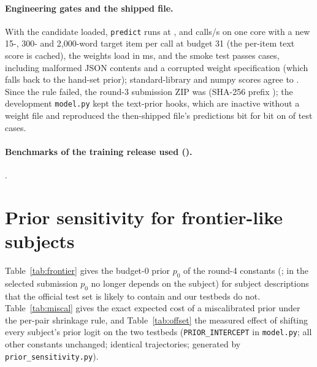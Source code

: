 \documentclass{article}
\begin{document}
\paragraph{Engineering gates and the shipped file.} With the candidate loaded, \texttt{predict} runs at \TpCpsShort, \TpCpsMid{} and \TpCpsLong{} calls/s on one core with a new 15-, 300- and 2,000-word target item per call at budget 31 (the per-item text score is cached), the weights load in \TpLoadMs{} ms, and the smoke test passes \TpSmokeCases{} cases, including malformed JSON contents and a corrupted weight specification (which falls back to the hand-set prior); standard-library and numpy scores agree to \TpCheckMaxDiff. Since the rule failed, the round-3 submission ZIP was \TpZipUnchanged{} (SHA-256 prefix \texttt{\TpZipShaShort}); the development \texttt{model.py} kept the text-prior hooks, which are inactive without a weight file and reproduced the then-shipped file's predictions bit for bit on \TpEquivSame{} of \TpEquivN{} test cases.

\paragraph{Benchmarks of the training release used (\TpNBench).} {\footnotesize \TpBenchList.}

\section{Prior sensitivity for frontier-like subjects}
\label{app:frontier}

Table~\ref{tab:frontier} gives the budget-0 prior $p_0$ of the round-4 constants (\FmShipId; in the selected submission $p_0$ no longer depends on the subject) for subject descriptions that the official test set is likely to contain and our testbeds do not. Table~\ref{tab:miscal} gives the exact expected cost of a miscalibrated prior under the per-pair shrinkage rule, and Table~\ref{tab:offset} the measured effect of shifting every subject's prior logit on the two testbeds (\texttt{PRIOR\_INTERCEPT} in \texttt{model.py}; all other constants unchanged; identical trajectories; generated by \texttt{prior\_sensitivity.py}).
\end{document}
